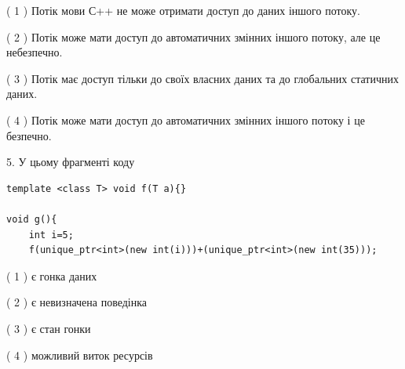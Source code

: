 \documentclass[12pt, ukrainian]{article}
\begin{document}
\begin {large}
{( 1 ) Потік мови С++ не може отримати доступ до даних іншого потоку.%

( 2 ) Потік може мати доступ до автоматичних змінних іншого потоку, але це небезпечно.%

( 3 ) Потік має доступ тільки до своїх власних даних та до глобальних статичних даних.%

( 4 ) Потік може мати доступ до автоматичних змінних іншого потоку і це безпечно.%


5. У цьому фрагменті коду
\begin{verbatim}
template <class T> void f(T a){}

void g(){
    int i=5;
    f(unique_ptr<int>(new int(i)))+(unique_ptr<int>(new int(35)));
\end{verbatim}
( 1 ) є гонка даних%

( 2 ) є невизначена поведінка%

( 3 ) є стан гонки%

( 4 ) можливий виток ресурсів%
}
\end {large}
\end{document}
